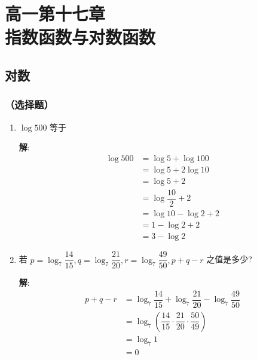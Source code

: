 \documentclass{report}
\newcommand{\sol}{\vspace{0.2cm}\textbf{解}:}
\begin{document}
\chapter*{高一第十七章\\指数函数与对数函数}

\setcounter{chapter}{17}
\setcounter{section}{1}

\setlength{\columnseprule}{0.4pt}
\setlength{\columnsep}{3em}

\allowdisplaybreaks

\begin{multicols*}{2}
    \section{对数}

    \subsection*{（选择题）}

    \begin{enumerate}[leftmargin=*]
        \item $\log 500$ 等于

              \sol{}
              \begin{align*}
                  \log 500 & =\log 5+\log 100      \\
                           & =\log 5+2\log 10      \\
                           & =\log 5+2             \\
                           & = \log\dfrac{10}{2}+2 \\
                           & = \log 10- \log 2+2   \\
                           & = 1 - \log2 + 2       \\
                           & = 3 - \log 2
              \end{align*}

        \item 若 $p=\log _7 \dfrac{14}{15}, q=\log _7 \dfrac{21}{20}, r=\log _7 \dfrac{49}{50}, p+q-r$ 之值是多少?

              \sol{}
              \begin{align*}
                  p+q-r & = \log_7 \dfrac{14}{15} + \log_7 \dfrac{21}{20} - \log_7 \dfrac{49}{50}          \\
                        & = \log_7 \left( \dfrac{14}{15} \cdot \dfrac{21}{20} \cdot \dfrac{50}{49} \right) \\
                        & = \log_7 1                                                                       \\
                        & = 0
              \end{align*}


\end{enumerate}
\end{multicols*}
\end{document}
